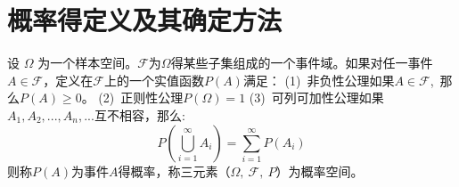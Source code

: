 \documentclass[lang=cn,newtx,10pt,scheme=chinese]{elegantbook}
\begin{document}
\section{概率得定义及其确定方法}
\begin{axiom}[概率三公理]
    设 $\Omega$ 为一个样本空间。$\mathscr{F}$为$\Omega$得某些子集组成的一个事件域。如果对任一事件$A \in \mathscr{F}$，定义在$\mathscr{F}$上的一个实值函数$P(A)$满足：\newline
    (1)\ 非负性公理\qquad \quad 如果$ A \in \mathscr{F}$,\ 那么$P(A) \ge 0$。\newline
    (2)\ 正则性公理\qquad \quad $P(\Omega)=1$ \newline
    (3)\ 可列可加性公理\quad 如果$A_1,A_2,...,A_n,...$互不相容，那么:\newline
    $$P(\bigcup_{i=1}^{\infty}A_i)=\sum_{i=1}^{\infty}{P(A_i)}$$
    则称$P(A)$为事件$A$得概率，称三元素（$\Omega,\ \mathscr{F},\ P$）为概率空间。
\end{axiom}
\end{document}
